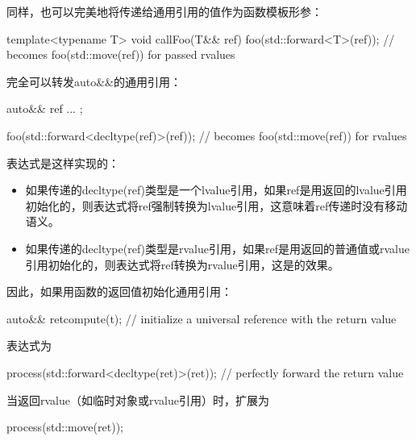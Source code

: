 同样，也可以完美地将传递给通用引用的值作为函数模板形参：

\begin{cppcode}
template<typename T>
void callFoo(T&& ref) {
	foo(std::forward<T>(ref)); // becomes foo(std::move(ref)) for passed rvalues
}
\end{cppcode}

完全可以转发auto\&\&的通用引用：

\begin{cppcode}
auto&& ref{ ... };

foo(std::forward<decltype(ref)>(ref)); // becomes foo(std::move(ref)) for rvalues
\end{cppcode}

表达式是这样实现的：

\begin{itemize}
	\item 如果传递的decltype(ref)类型是一个lvalue引用，如果ref是用返回的lvalue引用初始化的，则表达式将ref强制转换为lvalue引用，这意味着ref传递时没有移动语义。
	\item 如果传递的decltype(ref)类型是rvalue引用，如果ref是用返回的普通值或rvalue引用初始化的，则表达式将ref转换为rvalue引用，这是的效果。
\end{itemize}

因此，如果用函数的返回值初始化通用引用：

\begin{cppcode}
auto&& ret{compute(t)}; // initialize a universal reference with the return value
\end{cppcode}

表达式为

\begin{cppcode}
process(std::forward<decltype(ret)>(ret)); // perfectly forward the return value
\end{cppcode}

当返回rvalue（如临时对象或rvalue引用）时，扩展为

\begin{cppcode}
process(std::move(ret));
\end{cppcode}
























